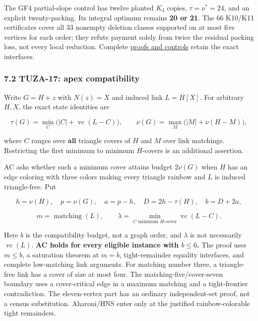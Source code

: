 \documentclass[11pt,a4paper]{article}
\begin{document}
The GF4 partial-slope control has twelve planted \(K_4\) copies, \(\tau=\nu^*=24\), and an explicit twenty-packing. Its integral optimum remains \textbf{20 or 21}. The 66 K10/K11 certificates cover all 33 nonempty deletion classes supported on at most five vertices for each order; they refute payment solely from twice the residual packing loss, not every local reduction. Complete \href{https://github.com/pappa211/ai-math-experiments/blob/main/problems/TUZA-16/PROOFS_AND_OBSTRUCTIONS.md}{proofs and controls} retain the exact interfaces.

\subsubsection{7.2 TUZA-17: apex compatibility}\label{tuza-17-apex-compatibility}

Write \(G=H+z\) with \(N(z)=X\) and induced link \(L=H[X]\). For arbitrary \(H,X\), the exact state identities are

\[\tau(G)=\min_C\bigl(|C|+\operatorname{vc}(L-C)\bigr),\qquad
\nu(G)=\max_M\bigl(|M|+\nu(H-M)\bigr),\]

where \(C\) ranges over \textbf{all} triangle covers of \(H\) and \(M\) over link matchings. Restricting the first minimum to minimum \(H\)-covers is an additional assertion.

AC asks whether such a minimum cover attains budget \(2\nu(G)\) when \(H\) has an edge coloring with three colors making every triangle rainbow and \(L\) is induced triangle-free. Put

\[h=\nu(H),\quad p=\nu(G),\quad a=p-h,\quad D=2h-\tau(H),\quad b=D+2a,\]

\[m=\operatorname{matching}(L),\qquad
\lambda=\min_{C\text{ minimum }H\text{-cover}}\operatorname{vc}(L-C).\]

Here \(b\) is the compatibility budget, not a graph order, and \(\lambda\) is not necessarily \(\operatorname{vc}(L)\). \textbf{AC holds for every eligible instance with \(b\le6\).} The proof uses \(m\le b\), a saturation theorem at \(m=b\), tight-remainder equality interfaces, and complete low-matching link arguments. For matching number three, a triangle-free link has a cover of size at most four. The matching-five/cover-seven boundary uses a cover-critical edge in a maximum matching and a tight-frontier contradiction. The eleven-vertex part has an ordinary independent-set proof, not a census substitution. Aharoni/HNS enter only at the justified rainbow-colorable tight remainders.
\end{document}
